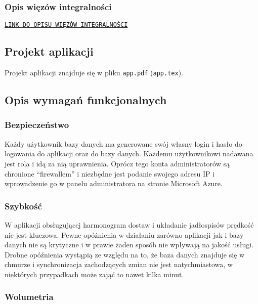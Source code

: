 \documentclass[10pt]{article}
\newcommand{\quotes}[1]{``#1''}
\begin{document}
\subsubsection{Opis więzów integralności}
\noindent \texttt{\href{https://wutwaw-my.sharepoint.com/:x:/g/personal/01143627_pw_edu_pl/ESLyg2i21LRBgUp8RWfRSLgB-xCOXny2bD24kXWuZf6KzA?rtime=QEzI1x4e2Ug}{LINK DO OPISU WIĘZÓW INTEGRALNOŚCI}}

\subsection{Projekt aplikacji}

\noindent Projekt aplikacji znajduje się w pliku \texttt{app.pdf} (\texttt{app.tex}).

\subsection{Opis wymagań funkcjonalnych}
\subsubsection{Bezpieczeństwo}
Każdy użytkownik bazy danych ma generowane swój własny login i hasło do logowania do aplikacji oraz do bazy danych. Każdemu użytkownikowi nadawana jest rola i idą za nią uprawnienia. Oprócz tego konta administratorów są chronione \quotes{firewallem} i niezbędne jest podanie swojego adresu IP i wprowadzenie go w panelu administratora na stronie Microsoft Azure.

\subsubsection{Szybkość}
W aplikacji obsługującej harmonogram dostaw i układanie jadłospisów prędkość nie jest kluczowa. Pewne opóźnienia w działaniu zarówno aplikacji jak i bazy danych nie są krytyczne i w prawie żaden sposób nie wpływają na jakość usługi. Drobne opóźnienia wystąpią ze względu na to, że baza danych znajduje się w chmurze i synchronizacja zachodzących zmian nie jest natychmiastowa, w niektórych przypadkach może zająć to nawet kilka minut.

\subsubsection{Wolumetria}
\end{document}
